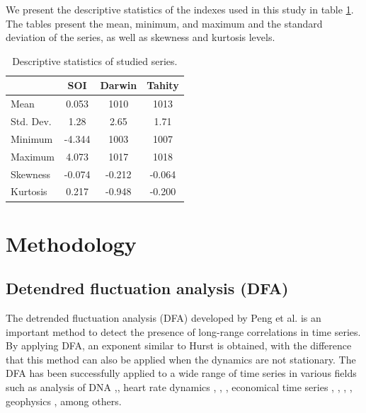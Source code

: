 \documentclass[onecolumn, preprint,aps,amsmath, amssymb, superscriptaddress]{revtex4}
\begin{document}
We present the descriptive statistics of the indexes used in this study in table \ref{tab:descriptive}. The tables present the mean, minimum, and maximum and the standard deviation of the series, as well as skewness and kurtosis levels.
\begin{table}[]
\caption{Descriptive statistics of studied series.}
\label{tab:descriptive}
\begin{tabular}{lccc}
\hline
          & SOI    & Darwin & Tahity \\ \hline
Mean      & 0.053  & 1010   & 1013   \\
Std. Dev. & 1.28   & 2.65   & 1.71   \\
Minimum   & -4.344 & 1003   & 1007   \\
Maximum   & 4.073  & 1017   & 1018   \\
Skewness  & -0.074 & -0.212 & -0.064 \\
Kurtosis  & 0.217  & -0.948 & -0.200 \\ \hline
\end{tabular}
\end{table}





\section{Methodology}
\label{sec:method}
\subsection{Detendred fluctuation analysis (DFA)}

The detrended fluctuation analysis (DFA) developed by Peng et al. \cite{Peng_3} is an important method  to detect the presence of long-range correlations in time series. By applying DFA, an exponent similar to Hurst is obtained, with the difference that this method can also be applied when the dynamics are not stationary. The DFA has been successfully applied to a wide range of time series in various fields such as  analysis of DNA \cite{Buldyrev_2},\cite{Buldyrev_3}, heart rate dynamics \cite{Peng_2}, \cite{Viswanathan} , \cite{Echeverria}, economical time series \cite{Cizeau}, \cite{Ausloos}, \cite{Jaroszewicz}, \cite{Mariani}, geophysics \cite{Ribeiro}, among others.
\end{document}
